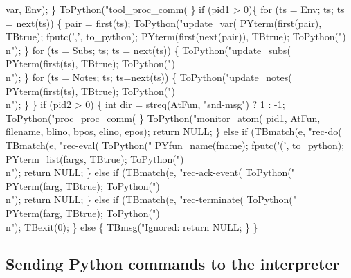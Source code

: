               var, Env);
      \}
      ToPython("tool_proc_comm(%
    \}
    if (pid1 > 0)\{
      for (ts = Env; ts; ts = next(ts)) \{
        pair = first(ts);
        ToPython("update_var(%
        PYterm(first(pair), TBtrue);
        fputc(',', to_python);
        PYterm(first(next(pair)), TBtrue);
        ToPython(")\\n");
      \} 
      for (ts = Subs; ts; ts = next(ts)) \{
        ToPython("update_subs(%
        PYterm(first(ts), TBtrue);
        ToPython(")\\n");
      \}
      for (ts = Notes; ts; ts=next(ts)) \{
        ToPython("update_notes(%
        PYterm(first(ts), TBtrue);
        ToPython(")\\n");  
      \}
    \}
    if (pid2 > 0) \{
      int dir = streq(AtFun, "snd-msg") ? 1 : -1;
      ToPython("proc_proc_comm(%
    \}
    ToPython("monitor_atom(%
                pid1, AtFun, filename, blino, bpos, elino, epos);
    return NULL;   
  \} else if (TBmatch(e, "rec-do(%
             TBmatch(e, "rec-eval(%
    ToPython("%
    PYfun_name(fname);
    fputc('(', to_python);
    PYterm_list(fargs, TBtrue);
    ToPython(")\\n");
    return NULL;
  \} else if (TBmatch(e, "rec-ack-event(%
    ToPython("%
    PYterm(farg, TBtrue);
    ToPython(")\\n");
    return NULL;
  \} else if (TBmatch(e, "rec-terminate(%
    ToPython("%
    PYterm(farg, TBtrue);
    ToPython(")\\n");
    TBexit(0);
  \} else \{
    TBmsg("Ignored: %
    return NULL;
  \}
\}
\nwendcode{}\nwdocspar


\subsection{Sending Python commands to the interpreter}

